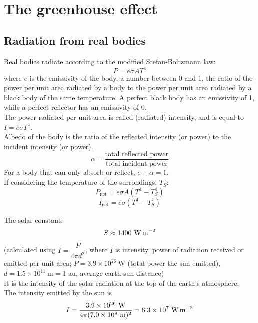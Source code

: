 \section{The greenhouse effect}
\subsection{Radiation from real bodies}
Real bodies radiate according to the modified Stefan-Boltzmann law:
\[P=e\sigma AT^4\]
where $e$ is the emissivity of the body, a number between 0 and 1, the ratio of the power per unit area radiated by a body to the power per unit area radiated by a black body of the same temperature. A perfect black body has an emissivity of 1, while a perfect reflector has an emissivity of 0.\\
The power radiated per unit area is called (radiated) intensity, and is equal to $I=e\sigma T^4$.\\
Albedo of the body is the ratio of the reflected intensity (or power) to the incident intensity (or power).
\[\alpha=\dfrac{\text{total reflected power}}{\text{total incident power}}\]
For a body that can only absorb or reflect, $e+\alpha=1$.\\
If considering the temperature of the surrondings, $T_S$:
\[P_\text{net}=e\sigma A(T^4-T_S^4)\]
\[I_\text{net}=e\sigma (T^4-T_S^4)\]
\begin{center}
\end{center}
The solar constant:
\[S\approx 1400\ \text{W\,m}^{-2}\]
(calculated using $I=\dfrac{P}{4\pi d^2}$, where $I$ is intensity, power of radiation received or emitted per unit area; $P=3.9\times 10^{26}\ \text{W}$ (total power the sun emitted), $d=1.5\times 10^{11}\ \text{m}=1$ au, average earth-sun distance)\\
It is the intensity of the solar radiation at the top of the earth's atmosphere.\\
The intensity emitted by the sun is
\[I=\dfrac{3.9\times 10^{26}\ \text{W}}{4\pi (7.0\times 10^8\ \text{m})^2}=6.3\times 10^7\ \text{W\,m}^{-2}\]
